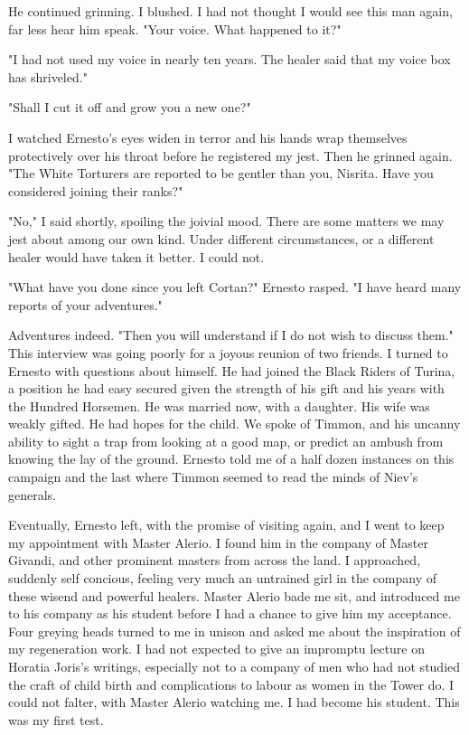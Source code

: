 \documentclass{article}
\begin{document}
He continued grinning. I blushed. I had not thought I would see this man again, far less hear him speak. "Your voice. What happened to it?"

"I had not used my voice in nearly ten years. The healer said that my voice box has shriveled."

"Shall I cut it off and grow you a new one?"

I watched Ernesto's eyes widen in terror and his hands wrap themselves protectively over his throat before he registered my jest. Then he grinned again. "The White Torturers are reported to be gentler than you, Nisrita. Have you considered joining their ranks?"

"No," I said shortly, spoiling the joivial mood. There are some matters we may jest about among our own kind. Under different circumstances, or a different healer would have taken it better. I could not.

"What have you done since you left Cortan?" Ernesto rasped. "I have heard many reports of your adventures."

Adventures indeed. "Then you will understand if I do not wish to discuss them." This interview was going poorly for a joyous reunion of two friends. I turned to Ernesto with questions about himself. He had joined the Black Riders of Turina, a position he had easy secured given the strength of his gift and his years with the Hundred Horsemen. He was married now, with a daughter. His wife was weakly gifted. He had hopes for the child. We spoke of Timmon, and his uncanny ability to sight a trap from looking at a good map, or predict an ambush from knowing the lay of the ground. Ernesto told me of a half dozen instances on this campaign and the last where Timmon seemed to read the minds of Niev's generals. 

Eventually, Ernesto left, with the promise of visiting again, and I went to keep my appointment with Master Alerio. I found him in the company of Master Givandi, and other prominent masters from across the land. I approached, suddenly self concious, feeling very much an untrained girl in the company of these wisend and powerful healers. Master Alerio bade me sit, and introduced me to his company as his student before I had a chance to give him my acceptance. Four greying heads turned to me in unison and asked me about the inspiration of my regeneration work. I had not expected to give an impromptu lecture on Horatia Joris's writings, especially not to a company of men who had not studied the craft of child birth and complications to labour as women in the Tower do. I could not falter, with Master Alerio watching me. I had become his student. This was my first test. 
\end{document}
